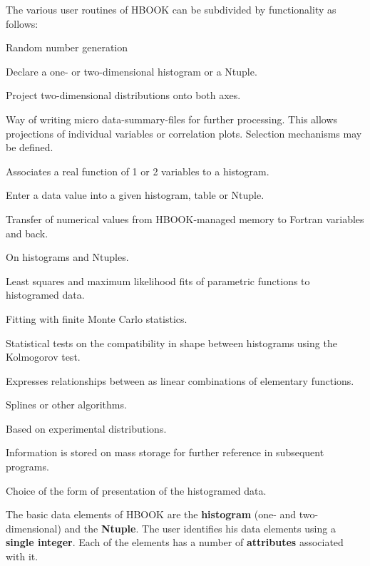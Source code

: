 The various user routines of HBOOK can be subdivided by functionality
as follows:
\begin{DL}{Random number generation}
\item[Booking]
      Declare a one- or two-dimensional histogram or a Ntuple.
\item[Projections]
      Project two-dimensional distributions onto both axes.
\item[Ntuples]
      Way of writing micro data-summary-files for further
      processing. This allows projections of
      individual variables or correlation plots. Selection mechanisms
      may be defined.
\item[Function representation]
      Associates a real function of 1 or 2 variables to a histogram.
\item[Filling]
      Enter a data value into a given histogram, table or Ntuple.
\item[Access to information]
      Transfer of numerical values from HBOOK-managed memory to Fortran
      variables and back.
\item[Arithmetic operations]
      On histograms and Ntuples.
\item[Fitting]
      Least squares and maximum likelihood fits of
      parametric functions to histogramed data.
\item[Monte Carlo testing]
      Fitting with finite Monte Carlo statistics.
\item[Differences between histograms]
      Statistical tests on the compatibility in shape between histograms
      using the Kolmogorov test.
\item[Parameterization]
      Expresses relationships between as linear combinations of elementary
      functions. 
\item[Smoothing]
      Splines or other algorithms.
\item[Random number generation]
      Based on experimental distributions.
\item[Archiving]
      Information is stored
      on mass storage for further reference in subsequent programs.
\item[Editing]
      Choice of the form of presentation of the histogramed data.
\end{DL}


The basic data elements of HBOOK are the {\bf histogram} (one-
and two-dimensional) and the {\bf Ntuple}. The user identifies
his data elements using a {\bf single integer}. Each of the
elements has a number of {\bf attributes} associated with it.

